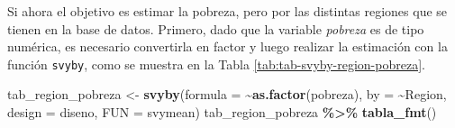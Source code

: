 \documentclass[
  spanish,
  12pt,
]{book}
\newenvironment{Shaded}{\begin{snugshade}}{\end{snugshade}}
\newcommand{\AttributeTok}[1]{\textcolor[rgb]{0.13,0.29,0.53}{#1}}
\newcommand{\FunctionTok}[1]{\textcolor[rgb]{0.13,0.29,0.53}{\textbf{#1}}}
\newcommand{\NormalTok}[1]{#1}
\newcommand{\OtherTok}[1]{\textcolor[rgb]{0.56,0.35,0.01}{#1}}
\newcommand{\SpecialCharTok}[1]{\textcolor[rgb]{0.81,0.36,0.00}{\textbf{#1}}}
\begin{document}
Si ahora el objetivo es estimar la pobreza, pero por las distintas regiones que se tienen en la base de datos. Primero, dado que la variable \emph{pobreza} es de tipo numérica, es necesario convertirla en factor y luego realizar la estimación con la función \texttt{svyby}, como se muestra en la Tabla \ref{tab:tab-svyby-region-pobreza}.

\begin{Shaded}
\begin{Highlighting}[]
\NormalTok{tab\_region\_pobreza }\OtherTok{\textless{}{-}} \FunctionTok{svyby}\NormalTok{(}\AttributeTok{formula =} \SpecialCharTok{\textasciitilde{}}\FunctionTok{as.factor}\NormalTok{(pobreza),  }\AttributeTok{by =} \SpecialCharTok{\textasciitilde{}}\NormalTok{Region,}
                            \AttributeTok{design =}\NormalTok{  diseno, }\AttributeTok{FUN =}\NormalTok{ svymean)}
\NormalTok{tab\_region\_pobreza }\SpecialCharTok{\%\textgreater{}\%}
  \FunctionTok{tabla\_fmt}\NormalTok{()}
\end{Highlighting}
\end{Shaded}
\end{document}
